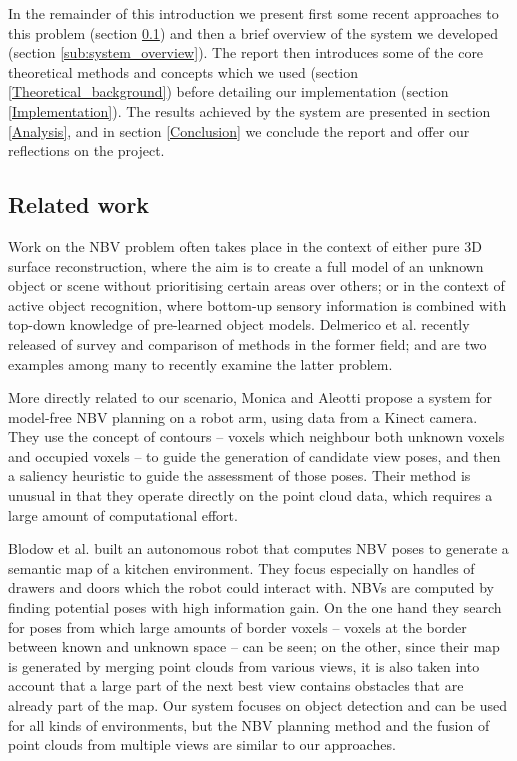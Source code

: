 In the remainder of this introduction we present first some recent approaches to this problem (section \ref{sub:related_work}) and then a brief overview of the system we developed (section \ref{sub:system_overview}).
The report then introduces some of the core theoretical methods and concepts which we used (section \ref{Theoretical_background}) before detailing our implementation (section \ref{Implementation}).
The results achieved by the system are presented in section \ref{Analysis}, and in section \ref{Conclusion} we conclude the report and offer our reflections on the project.

\subsection{Related work}
\label{sub:related_work}

Work on the NBV problem often takes place in the context of either pure 3D surface reconstruction, where the aim is to create a full model of an unknown object or scene without prioritising certain areas over others; or in the context of active object recognition, where bottom-up sensory information is combined with top-down knowledge of pre-learned object models.
Delmerico et al.\cite{delmerico2017nbvsurvey} recently released of survey and comparison of methods in the former field; \cite{xu2016} and \cite{doumanoglou2016} are two examples among many to recently examine the latter problem.

More directly related to our scenario, Monica and Aleotti\cite{monica2017} propose a system for model-free NBV planning on a robot arm, using data from a Kinect camera.
They use the concept of contours -- voxels which neighbour both unknown voxels and occupied voxels -- to guide the generation of candidate view poses, and then a saliency heuristic to guide the assessment of those poses.
Their method is unusual in that they operate directly on the point cloud data, which requires a large amount of computational effort.

Blodow et al.\cite{blodow2011autonomous} built an autonomous robot that computes NBV poses to generate a semantic map of a kitchen environment.
They focus especially on handles of drawers and doors which the robot could interact with.
NBVs are computed by finding potential poses with high information gain.
On the one hand they search for poses from which large amounts of border voxels -- voxels at the border between known and unknown space -- can be seen; on the other, since their map is generated by merging point clouds from various views, it is also taken into account that a large part of the next best view contains obstacles that are already part of the map.
Our system focuses on object detection and can be used for all kinds of environments, but the NBV planning method and the fusion of point clouds from multiple views are similar to our approaches.

